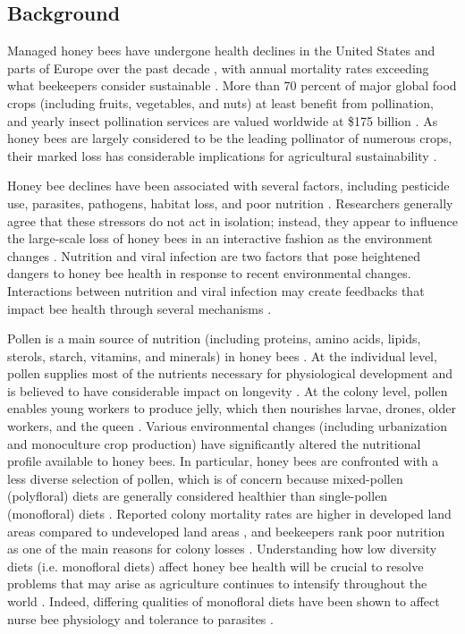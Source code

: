 \documentclass{bmcart}
\begin{document}
\begin{linenumbers} %
\begin{doublespacing} %

\section*{Background}

Managed honey bees have undergone health declines in the United States and parts of Europe over the past decade \cite{ccd1, ccd2, ccd3}, with annual mortality rates exceeding what beekeepers consider sustainable \cite{ccd5, ccd6}. More than 70 percent of major global food crops (including fruits, vegetables, and nuts) at least benefit from pollination, and yearly insect pollination services are valued worldwide at \$175 billion \cite{ccd7}. As honey bees are largely considered to be the leading pollinator of numerous crops, their marked loss has considerable implications for agricultural sustainability \cite{ccd4}.

Honey bee declines have been associated with several factors, including pesticide use, parasites, pathogens, habitat loss, and poor nutrition \cite{factors, factors2}. Researchers generally agree that these stressors do not act in isolation; instead, they appear to influence the large-scale loss of honey bees in an interactive fashion as the environment changes \cite{interacting}. Nutrition and viral infection are two factors that pose heightened dangers to honey bee health in response to recent environmental changes. Interactions between nutrition and viral infection may create feedbacks that impact bee health through several mechanisms \cite{adamInt, AdamTothReview}. 

Pollen is a main source of nutrition (including proteins, amino acids, lipids, sterols, starch, vitamins, and minerals) in honey bees \cite{source, source2}. At the individual level, pollen supplies most of the nutrients necessary for physiological development \cite{brodschneider} and is believed to have considerable impact on longevity \cite{longevity}. At the colony level, pollen enables young workers to produce jelly, which then nourishes larvae, drones, older workers, and the queen \cite{jelly, jelly2}. Various environmental changes (including urbanization and monoculture crop production) have significantly altered the nutritional profile available to honey bees. In particular, honey bees are confronted with a less diverse selection of pollen, which is of concern because mixed-pollen (polyfloral) diets are generally considered healthier than single-pollen (monofloral) diets \cite{diverse, diverse2, alaux}. Reported colony mortality rates are higher in developed land areas compared to undeveloped land areas \cite{undeveloped}, and beekeepers rank poor nutrition as one of the main reasons for colony losses \cite{bkLoss}. Understanding how low diversity diets (i.e. monofloral diets) affect honey bee health will be crucial to resolve problems that may arise as agriculture continues to intensify throughout the world \cite{ag, ag2}. Indeed, differing qualities of monofloral diets have been shown to affect nurse bee physiology and tolerance to parasites \cite{DiPasquale}.


\end{doublespacing}
\end{linenumbers}
\end{document}

